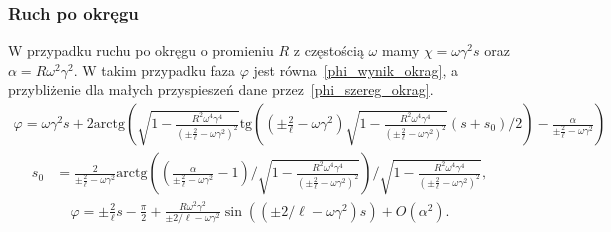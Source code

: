 \subsubsection{Ruch po okręgu}
W przypadku ruchu po okręgu o promieniu $R$ z 
częstością $\omega$ mamy
$\chi = \omega \gamma^2 s$ oraz 
$\alpha = R\omega^2\gamma^2 $.
W takim przypadku faza $\varphi$ jest 
równa~\eqref{phi_wynik_okrag}, a 
przybliżenie dla małych przyspieszeń dane 
przez~\eqref{phi_szereg_okrag}.
\begin{align}\label{phi_wynik_okrag}
\varphi = \omega\gamma^2 s +  
2\text{arctg} \left( 
\sqrt{ 1-\frac{R^2\omega^4\gamma^4}{\left( \pm \frac{2}{\ell} 
-\omega\gamma^2 \right)^2 } }
\text{tg} \left( 
\left( \pm \frac{2}{\ell} -\omega\gamma^2 \right)
\sqrt{ 1-\frac{R^2\omega^4\gamma^4}{\left( \pm \frac{2}{\ell} 
-\omega\gamma^2 \right)^2 } }(s + s_0)/2
\right)  
- \frac{\alpha}{\pm \frac{2}{\ell} -\omega\gamma^2}
\right)
\end{align}
\begin{align*}
s_0 & = \frac{2}{\pm \frac{2}{\ell} -\omega\gamma^2} 
\text{arctg}  
\left( \left( \frac{\alpha}{\pm \frac{2}{\ell} 
-\omega\gamma^2} - 1 \right) \Big /  
\sqrt{ 1-\frac{R^2\omega^4\gamma^4}{\left( \pm \frac{2}{\ell} 
-\omega\gamma^2 \right)^2 } }
\right)\Big /   
\sqrt{ 1-\frac{R^2\omega^4\gamma^4}{\left( \pm \frac{2}{\ell} 
-\omega\gamma^2 \right)^2 } },
\end{align*}
\begin{align}\label{phi_szereg_okrag}
\varphi =  \pm \frac{2}{\ell}s - \frac{\pi}{2} 
+
\frac{R \omega^2 \gamma^2}{\pm 2/\ell - \omega\gamma^2}
\sin ( (\pm 2/\ell - \omega\gamma^2) s )  
+O(\alpha^2).
\end{align}

